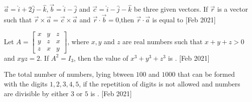 	\item $\vec{a}=\hat{i}+2\hat{j}-\hat{k},\vec{b}=\hat{i}-\hat{j}$ and $\vec{c}=\hat{i}-\hat{j}-\hat{k}$ be three given vectors. If $\vec{r}$ is a vector such that $\vec{r}\times\vec{a}=\vec{c}\times\vec{a}$ and $\vec{r}\cdot\vec{b}=0$,then $\vec{r}\cdot\vec{a}$ is equal to  \hfill{[Feb 2021]}

	\item Let $A=\begin{bmatrix}
			x & y & z \\
			y & z & x \\
			z & x & y 
	\end{bmatrix}$, where $x, y$ and $z$ are real numbers such that $x+y+z>0$ and $xyz=2$. If $A^2=I_3$, then the value of $x^3+y^3+z^3$ is . \hfill{[Feb 2021]}


        \item The total number of numbers, lying btween $100$ and $1000$ that can be formed with the digits $1, 2, 3, 4, 5$, if the repetition of digits is not allowed and numbers are divisible by either $3$ or $5$ is .  \hfill{[Feb 2021]}

